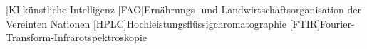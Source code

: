 
\begin{acronym}[LONGEST]
    [KI]{künstliche Intelligenz}
    [FAO]{Ernährungs- und Landwirtschaftsorganisation der Vereinten Nationen}
    [HPLC]{Hochleistungsflüssigchromatographie}
    [FTIR]{Fourier-Transform-Infrarotspektrosko\-pie}
\end{acronym}